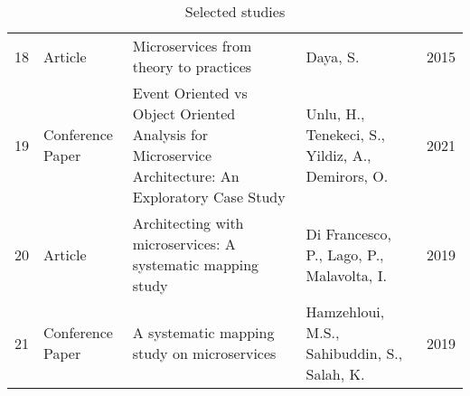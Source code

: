 \begin{table*}[!t]
\begin{tabular}{llp{3in}p{2in}r}
        18 & Article                & Microservices from theory to practices                                                              & Daya, S.                                                                                            & 2015          \\
        19 & Conference Paper       & Event Oriented vs Object Oriented Analysis for Microservice Architecture: An Exploratory Case Study & Unlu, H., Tenekeci, S., Yildiz, A., Demirors, O.                                                    & 2021          \\
        20 & Article                & Architecting with microservices: A systematic mapping study                                         & Di Francesco, P., Lago, P., Malavolta, I.                                                           & 2019          \\
        21 & Conference Paper       & A systematic mapping study on microservices                                                         & Hamzehloui, M.S., Sahibuddin, S., Salah, K.                                                         & 2019          \\
        \bottomrule
    \end{tabular}
    \caption{Selected studies}
    \label{table:selected-studies}
\end{table*}